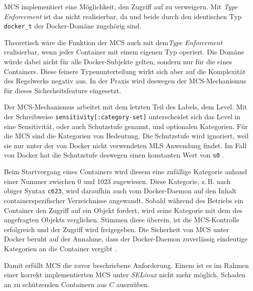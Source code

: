 \documentclass[../main.tex]{subfiles}
\begin{document}
					\acrshort{MCS} implementiert eine Möglichkeit, \cbroken{} den Zugriff auf \cvalid{} zu verweigern. Mit \emph{Type Enforcement} ist das nicht realisierbar, da \cbroken{} und \cvalid{} beide durch den identischen Typ \texttt{docker\_t} der Docker-Domäne zugehörig sind.

					Theoretisch wäre die Funktion der MCS auch mit dem\emph{Type Enforcement} realisierbar, wenn jeder Container mit einem eigenen Typ operiert. Die Domäne würde dabei nicht für alle Docker-Subjekte gelten, sondern nur für die eines Containers. Diese feinere Typenunterteilung wirkt sich aber auf die Komplexität des Regelwerks negativ aus. In der Praxis wird deswegen der MCS-Mechanismus für dieses Sicherheitsfeature eingesetzt.


					Der MCS-Mechanismus arbeitet mit dem letzten Teil des Labels, dem Level. Mit der Schreibweise \texttt{sensitivity[:category-set]} unterscheidet sich das Level in eine Sensitivität, oder auch Schutzstufe genannt, und optionalen Kategorien. Für die MCS sind die Kategorien von Bedeutung. Die Schutzstufe wird ignoriert, weil sie nur unter der von Docker nicht verwendeten \acrshort{MLS} Anwendung findet. Im Fall von Docker hat die Schutzstufe deswegen einen konstanten Wert von \texttt{s0} \cite{selinuxRedhatMCS}\cite{selinuxJamesMorrisMCS}.

					Beim Startvorgang eines Containers wird diesem eine zufällige Kategorie anhand einer Nummer zwischen 0 und 1023 zugewiesen. Diese Kategorie, z.\,B. nach obiger Syntax \texttt{c623}, wird daraufhin auch vom Docker-Daemon auf den Inhalt containerspezifischer Verzeichnisse angewandt. Sobald während des Betriebs ein Container den Zugriff auf ein Objekt fordert, wird seine Kategorie mit dem des angefragten Objekts verglichen. Stimmen diese überein, ist die MCS-Kontrolle erfolgreich und der Zugriff wird freigegeben. Die Sicherheit von MCS unter Docker beruht auf der Annahme, dass der Docker-Daemon zuverlässig eindeutige Kategorien an die Container vergibt \cite[S.200f.]{learningDocker}.



					Damit erfüllt MCS die zuvor beschriebene Anforderung. Einem \cbroken{} ist es im Rahmen einer korrekt implementierten MCS unter \emph{SELinux} nicht mehr möglich, Schaden an zu schützenden Containern aus \(C\) auszuüben.
\end{document}
